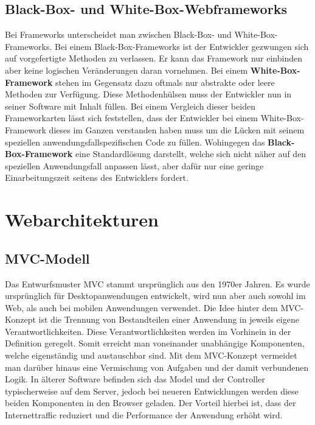 \subsection{Black-Box- und White-Box-Webframeworks}

Bei Frameworks unterscheidet man zwischen Black-Box- und White-Box-Frameworks. Bei einem Black-Box-Frameworks ist der Entwickler gezwungen sich auf vorgefertigte Methoden zu verlassen. Er kann das Framework nur einbinden aber keine logischen Veränderungen daran vornehmen. Bei einem \textbf{White-Box-Framework} stehen im Gegensatz dazu oftmals nur abstrakte oder leere Methoden zur Verfügung. Diese Methodenhülsen muss der Entwickler nun in seiner Software mit Inhalt füllen. Bei einem Vergleich dieser beiden Frameworkarten lässt sich feststellen, dass der Entwickler bei einem 
White-Box-Framework dieses im Ganzen verstanden haben muss um die Lücken mit seinem speziellen anwendungsfallspezifischen Code zu füllen. Wohingegen das \textbf{Black-Box-Framework} eine Standardlösung darstellt, welche sich nicht näher auf den speziellen Anwendungsfall anpassen lässt, aber dafür nur eine geringe Einarbeitungszeit seitens des Entwicklers fordert.

\section{Webarchitekturen}

\subsection{MVC-Modell}

Das Entwurfsmuster MVC stammt ursprünglich aus den 1970er Jahren. Es wurde ursprünglich für Desktopanwendungen entwickelt, wird nun aber auch sowohl im Web, als auch bei mobilen Anwendungen verwendet. Die Idee hinter dem MVC-Konzept ist die Trennung von Bestandteilen einer Anwendung in jeweils eigene Verantwortlichkeiten. Diese Verantwortlichkeiten werden im Vorhinein in der Definition geregelt. Somit erreicht man voneinander unabhängige Komponenten, welche eigenständig und austauschbar sind. Mit dem MVC-Konzept vermeidet man darüber hinaus eine Vermischung von Aufgaben und der damit verbundenen Logik. In älterer Software befinden sich das Model und der Controller typischerweise auf dem Server, jedoch bei neueren Entwicklungen werden diese beiden Komponenten in den Browser geladen. Der Vorteil hierbei ist, dass der Internettraffic reduziert und die Performance der Anwendung erhöht wird.\autocites[vgl.][7\psqq]{Steyer2017}

